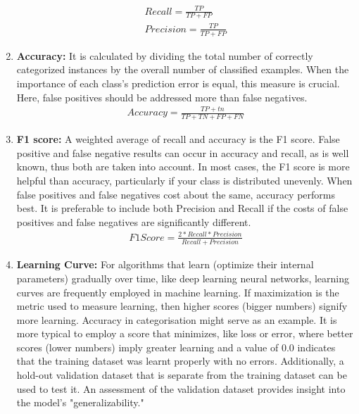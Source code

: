 \begin{enumerate}
\newline
\begin{align*}
Recall = \frac{TP}{TP+FP} 
\\
Precision = \frac{TP}{TP+FP}
\end{align*}
\newline
    \item \textbf{Accuracy:} It is calculated by dividing the total number of correctly categorized instances by the overall number of classified examples. When the importance of each class's prediction error is equal, this measure is crucial. Here, false positives should be addressed more than false negatives.
\newline
\begin{align*}
Accuracy = \frac{TP+tn}{TP+TN+FP+FN} 
\end{align*}
\newline
    \item \textbf{F1 score:} A weighted average of recall and accuracy is the F1 score. False positive and false negative results can occur in accuracy and recall, as is well known, thus both are taken into account. In most cases, the F1 score is more helpful than accuracy, particularly if your class is distributed unevenly. When false positives and false negatives cost about the same, accuracy performs best. It is preferable to include both Precision and Recall if the costs of false positives and false negatives are significantly different.
\newline
\begin{align*}
F1 Score = \frac{2*Recall*Precision}{Recall+Precision} 
\end{align*}
\newline
    \item \textbf{Learning Curve:} For algorithms that learn (optimize their internal parameters) gradually over time, like deep learning neural networks, learning curves are frequently employed in machine learning. If maximization is the metric used to measure learning, then higher scores (bigger numbers) signify more learning. Accuracy in categorisation might serve as an example. It is more typical to employ a score that minimizes, like loss or error, where better scores (lower numbers) imply greater learning and a value of 0.0 indicates that the training dataset was learnt properly with no errors. Additionally, a hold-out validation dataset that is separate from the training dataset can be used to test it. An assessment of the validation dataset provides insight into the model's "generalizability."

\end{enumerate}
